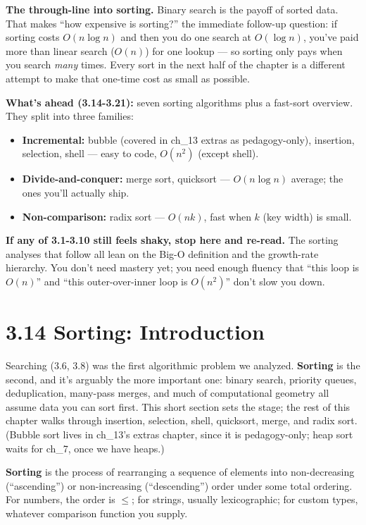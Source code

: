 \documentclass[11pt]{article}
\begin{document}
\begin{ideabox}
\medskip
\textbf{The through-line into sorting.} Binary search is the payoff of
sorted data. That makes ``how expensive is sorting?'' the immediate
follow-up question: if sorting costs $O(n \log n)$ and then you do one
search at $O(\log n)$, you've paid more than linear search ($O(n)$) for
one lookup — so sorting only pays when you search \emph{many} times.
Every sort in the next half of the chapter is a different attempt to make
that one-time cost as small as possible.

\medskip
\textbf{What's ahead (3.14-3.21):} seven sorting algorithms plus a fast-sort
overview. They split into three families:
\begin{itemize}
    \item \textbf{Incremental:} bubble (covered in ch\_13 extras as pedagogy-only), insertion, selection, shell —
    easy to code, $O(n^2)$ (except shell).
    \item \textbf{Divide-and-conquer:} merge sort, quicksort — $O(n \log n)$
    average; the ones you'll actually ship.
    \item \textbf{Non-comparison:} radix sort — $O(n k)$, fast when $k$
    (key width) is small.
\end{itemize}

\medskip
\textbf{If any of 3.1-3.10 still feels shaky, stop here and re-read.} The
sorting analyses that follow all lean on the Big-O definition and the
growth-rate hierarchy. You don't need mastery yet; you need enough
fluency that ``this loop is $O(n)$'' and ``this outer-over-inner loop
is $O(n^2)$'' don't slow you down.
\end{ideabox}

\section{3.14 Sorting: Introduction}

Searching (3.6, 3.8) was the first algorithmic problem we analyzed.
\textbf{Sorting} is the second, and it's arguably the more important
one: binary search, priority queues, deduplication, many-pass merges,
and much of computational geometry all assume data you can sort
first. This short section sets the stage; the rest of this chapter
walks through insertion, selection, shell, quicksort, merge, and radix
sort. (Bubble sort lives in ch\_13's extras chapter, since it is
pedagogy-only; heap sort waits for ch\_7, once we have heaps.)

\begin{defnbox}[Sorting]
\textbf{Sorting} is the process of rearranging a sequence of elements
into non-decreasing (``ascending'') or non-increasing (``descending'')
order under some total ordering. For numbers, the order is $\le$;
for strings, usually lexicographic; for custom types, whatever
comparison function you supply.
\end{defnbox}
\end{document}
